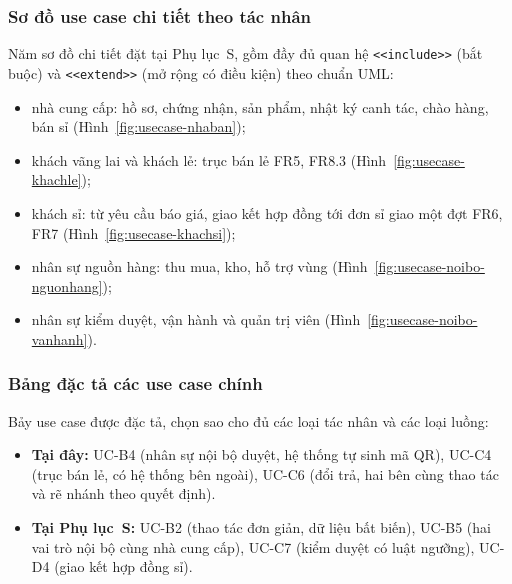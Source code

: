 \subsubsection*{Sơ đồ use case chi tiết theo tác nhân}

Năm sơ đồ chi tiết đặt tại Phụ lục~S, gồm đầy đủ quan hệ \texttt{<<include>>} (bắt buộc) và \texttt{<<extend>>} (mở rộng có điều kiện) theo chuẩn UML:
\begin{itemize}
    \item nhà cung cấp: hồ sơ, chứng nhận, sản phẩm, nhật ký canh tác, chào hàng, bán sỉ (Hình~\ref{fig:usecase-nhaban});
    \item khách vãng lai và khách lẻ: trục bán lẻ FR5, FR8.3 (Hình~\ref{fig:usecase-khachle});
    \item khách sỉ: từ yêu cầu báo giá, giao kết hợp đồng tới đơn sỉ giao một đợt FR6, FR7 (Hình~\ref{fig:usecase-khachsi});
    \item nhân sự nguồn hàng: thu mua, kho, hỗ trợ vùng (Hình~\ref{fig:usecase-noibo-nguonhang});
    \item nhân sự kiểm duyệt, vận hành và quản trị viên (Hình~\ref{fig:usecase-noibo-vanhanh}).
\end{itemize}

\subsubsection*{Bảng đặc tả các use case chính}

Bảy use case được đặc tả, chọn sao cho đủ các loại tác nhân và các loại luồng:
\begin{itemize}
    \item \textbf{Tại đây:} UC-B4 (nhân sự nội bộ duyệt, hệ thống tự sinh mã QR), UC-C4 (trục bán lẻ, có hệ thống bên ngoài), UC-C6 (đổi trả, hai bên cùng thao tác và rẽ nhánh theo quyết định).
    \item \textbf{Tại Phụ lục~S:} UC-B2 (thao tác đơn giản, dữ liệu bất biến), UC-B5 (hai vai trò nội bộ cùng nhà cung cấp), UC-C7 (kiểm duyệt có luật ngưỡng), UC-D4 (giao kết hợp đồng sỉ).
\end{itemize}

